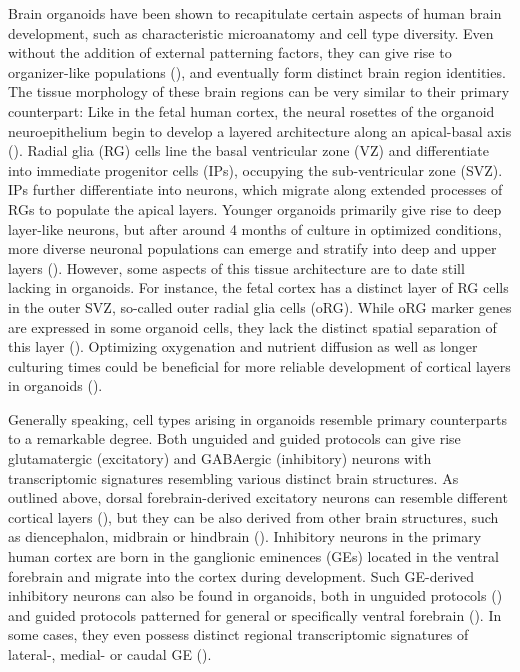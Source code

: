 Brain organoids have been shown to recapitulate certain aspects of human brain development, such as characteristic microanatomy and cell type diversity. Even without the addition of external patterning factors, they can give rise to organizer-like populations (\cite{renner_self-organized_2017}), and eventually form distinct brain region identities. The tissue morphology of these brain regions can be very similar to their primary counterpart: Like in the fetal human cortex, the neural rosettes of the organoid neuroepithelium begin to develop a layered architecture along an apical-basal axis (\cite{kadoshima_self-organization_2013,lancaster_cerebral_2013}). Radial glia (RG) cells line the basal ventricular zone (VZ) and differentiate into immediate progenitor cells (IPs), occupying the sub-ventricular zone (SVZ). IPs further differentiate into neurons, which migrate along extended processes of RGs to populate the apical layers. Younger organoids primarily give rise to deep layer-like neurons, but after around 4 months of culture in optimized conditions, more diverse neuronal populations can emerge and stratify into deep and upper layers (\cite{kanton_organoid_2019,qian_sliced_2020}). However, some aspects of this tissue architecture are to date still lacking in organoids. For instance, the fetal cortex has a distinct layer of RG cells in the outer SVZ, so-called outer radial glia cells (oRG). While oRG marker genes are expressed in some organoid cells, they lack the distinct spatial separation of this layer (\cite{bhaduri_cell_2020}). Optimizing oxygenation and nutrient diffusion as well as longer culturing times could be beneficial for more reliable development of cortical layers in organoids (\cite{bhaduri_cell_2020,chiaradia_brain_2020}).

Generally speaking, cell types arising in organoids resemble primary counterparts to a remarkable degree. Both unguided and guided protocols can give rise glutamatergic (excitatory) and GABAergic (inhibitory) neurons with transcriptomic signatures resembling various distinct brain structures. As outlined above, dorsal forebrain-derived excitatory neurons can resemble different cortical layers (\cite{kanton_organoid_2019,qian_sliced_2020}), but they can be also derived from other brain structures, such as diencephalon, midbrain or hindbrain (\cite{kanton_organoid_2019}). 
Inhibitory neurons in the primary human cortex are born in the ganglionic eminences (GEs) located in the ventral forebrain and migrate into the cortex during development. Such GE-derived inhibitory neurons can also be found in organoids, both in unguided protocols (\cite{kanton_organoid_2019}) and guided protocols patterned for general or specifically ventral forebrain (\cite{velasco_individual_2019,birey_assembly_2017,miura_generation_2020}). In some cases, they even possess distinct regional transcriptomic signatures of lateral-, medial- or caudal GE (\cite{kanton_organoid_2019,miura_generation_2020}). 

